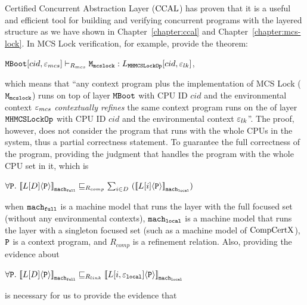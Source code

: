 Certified Concurrent Abstraction Layer  ($\mathrm{CCAL}$) 
has proven that it is a useful and efficient tool 
for building and verifying concurrent programs with the layered structure 
as we have shown in Chapter~\ref{chapter:ccal} and Chapter~\ref{chapter:mcs-lock}.
In MCS Lock verification, for example, provide 
the theorem:
\begin{center}
${\mathrm{\texttt{MBoot}}}[cid, {\varepsilon}_{mcs}] \vdash_{R_{mcs}} {\mathrm{\texttt{M}}}_{{\mathrm{\texttt{mcslock}}}} : L_{{\mathrm{\texttt{MHMCSLockOp}}}}[cid, {\varepsilon}_{lk}]$,
\end{center}
which means that ``any context program plus the implementation of MCS Lock (${\mathrm{\texttt{M}}}_{{\mathrm{\texttt{mcslock}}}}$) runs on top of 
  layer ${\mathrm{\texttt{MBoot}}}$ with CPU ID $cid$ and the environmental context ${\varepsilon}_{mcs}$ \textit{contextually refines}
 the same context program runs on the of  layer ${\mathrm{\texttt{MHMCSLockOp}}}$ with CPU ID $cid$ and the environmental context ${\varepsilon}_{lk}$''. 
The proof, however, does not consider the program that runs with the whole CPUs in the system, thus a partial correctness statement. 
To guarantee the full correctness of the program,
providing the judgment that handles the program with the whole CPU set in it, which is
\begin{center}
$\forall \codeinmath{P}. \ \semwmachine{L[D]}{\codeinmath{P}}{\codeinmath{mach}_{\codeinmath{full}}} \refines_{R_{comp}} \sum_{i \in D}\  (\semwmachine{L[i]}{\codeinmath{P}}{\codeinmath{mach}_{\codeinmath{local}}})$
\end{center}
when ${\mathrm{\texttt{mach}}}_{{\mathrm{\texttt{full}}}}$ is a machine model that runs the layer with the full focused set (without any environmental contexts),
${\mathrm{\texttt{mach}}}_{{\mathrm{\texttt{local}}}}$ is a machine model that runs the layer with a singleton focused set (such as a machine model of $\mathrm{CompCertX}$),
${\mathrm{\texttt{P}}}$ is a context program, 
and $R_{comp}$ is a refinement relation.
Also, 
providing the evidence about
\begin{center}
$\forall \codeinmath{P}. \ \semwmachine{L[D]}{\codeinmath{P}}{\codeinmath{mach}_{\codeinmath{full}}} \refines_{R_{link}} \semwmachine{L[i, \oracle_{\codeinmath{local}}]}{\codeinmath{P}}{\codeinmath{mach}_{\codeinmath{local}}}$
\end{center}
is necessary for us to provide the evidence that
